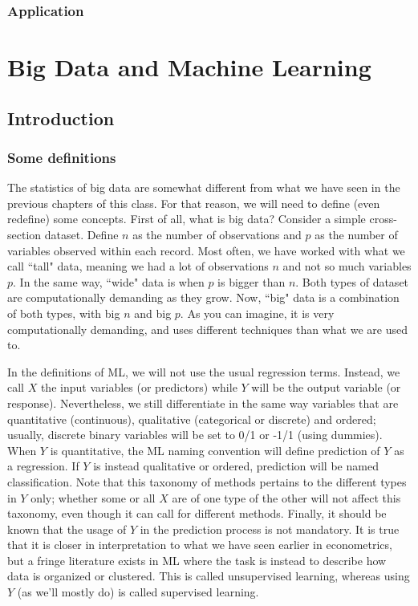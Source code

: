 \documentclass[12pt]{report}
\begin{document}
\subsection{Application}



\chapter{Big Data and Machine Learning}

\section{Introduction}

\subsection{Some definitions}

The statistics of big data are somewhat different from what we have seen in the previous chapters of this class. For that reason, we will need to define (even redefine) some concepts. First of all, what is big data? Consider a simple cross-section dataset. Define $n$ as the number of observations and $p$ as the number of variables observed within each record. Most often, we have worked with what we call ``tall" data, meaning we had a lot of observations $n$ and not so much variables $p$. In the same way, ``wide" data is when $p$ is bigger than $n$. Both types of dataset are computationally demanding as they grow. Now, ``big" data is a combination of both types, with big $n$ and big $p$. As you can imagine, it is very computationally demanding, and uses different techniques than what we are used to.

In the definitions of ML, we will not use the usual regression terms. Instead, we call $X$ the input variables (or predictors) while $Y$ will be the output variable (or response). Nevertheless, we still differentiate in the same way variables that are quantitative (continuous), qualitative (categorical or discrete) and ordered; usually, discrete binary variables will be set to 0/1 or -1/1 (using dummies). When $Y$ is quantitative, the ML naming convention will define prediction of $Y$ as a regression. If $Y$ is instead qualitative or ordered, prediction will be named classification. Note that this taxonomy of methods pertains to the different types in $Y$ only; whether some or all $X$ are of one type of the other will not affect this taxonomy, even though it can call for different methods. Finally, it should be known that the usage of $Y$ in the prediction process is not mandatory. It is true that it is closer in interpretation to what we have seen earlier in econometrics, but a fringe literature exists in ML where the task is instead to describe how data is organized or clustered. This is called unsupervised learning, whereas using $Y$ (as we'll mostly do) is called supervised learning.
\end{document}
